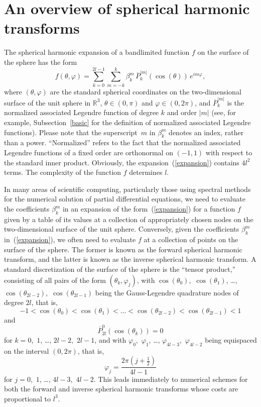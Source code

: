 \documentclass[final,3p,times]{elsarticle}
\def\phi{\varphi}
\begin{document}
\section{An overview of spherical harmonic transforms}
\label{overview}

The spherical harmonic expansion of a bandlimited function $f$
on the surface of the sphere has the form
\begin{equation}
\label{expansion}
f(\theta,\phi) = \sum_{k=0}^{2l-1} \sum_{m=-k}^k \beta_k^m
\, \overline{P}_k^{|m|}(\cos(\theta)) \, e^{i m \phi},
\end{equation}
where $(\theta,\phi)$ are the standard spherical coordinates
on the two-dimensional surface of the unit sphere in $\mathbb{R}^3$,
$\theta \in (0,\pi)$ and $\phi \in (0,2\pi)$,
and $\overline{P}_k^{|m|}$ is the normalized associated Legendre function
of degree $k$ and order $|m|$ (see, for example, Subsection~\ref{basic}
for the definition of normalized associated Legendre functions).
Please note that the superscript~$m$ in $\beta^m_k$ denotes an index,
rather than a power. ``Normalized'' refers to the fact that
the normalized associated Legendre functions
of a fixed order are orthonormal on $(-1,1)$
with respect to the standard inner product.
Obviously, the expansion~(\ref{expansion}) contains $4 l^2$ terms.
The complexity of the function $f$ determines $l$.

In many areas of scientific computing, particularly those
using spectral methods for the numerical solution
of partial differential equations,
we need to evaluate the coefficients $\beta^m_k$
in an expansion of the form~(\ref{expansion})
for a function $f$ given by a table of its values
at a collection of appropriately chosen nodes
on the two-dimensional surface of the unit sphere.
Conversely, given the coefficients $\beta^m_k$ in~(\ref{expansion}),
we often need to evaluate $f$ at a collection of points
on the surface of the sphere.
The former is known as the forward spherical harmonic transform,
and the latter is known as the inverse spherical harmonic transform.
A standard discretization of the surface of the sphere
is the ``tensor product,''
consisting of all pairs of the form $(\theta_k,\phi_j)$,
with $\cos(\theta_0)$,~$\cos(\theta_1)$, \dots,
$\cos(\theta_{2l-2})$,~$\cos(\theta_{2l-1})$
being the Gauss-Legendre quadrature nodes of degree $2l$, that is,
\begin{equation}
-1 < \cos(\theta_0) < \cos(\theta_1) < \ldots
   < \cos(\theta_{2l-2}) < \cos(\theta_{2l-1}) < 1
\end{equation}
and
\begin{equation}
\label{thetas}
\overline{P}^0_{2l}(\cos(\theta_k)) = 0
\end{equation}
for $k = 0$,~$1$, \dots, $2l-2$,~$2l-1$,
and with $\phi_0$,~$\phi_1$, \dots, $\phi_{4l-3}$,~$\phi_{4l-2}$
being equispaced on the interval $(0,2\pi)$, that is,
\begin{equation}
\label{phis}
\phi_j = \frac{2\pi \left( j+\frac{1}{2} \right)}{4l-1}
\end{equation}
for $j = 0$,~$1$, \dots, $4l-3$,~$4l-2$.
This leads immediately to numerical schemes
for both the forward and inverse spherical harmonic transforms
whose costs are proportional to $l^3$.
\end{document}
